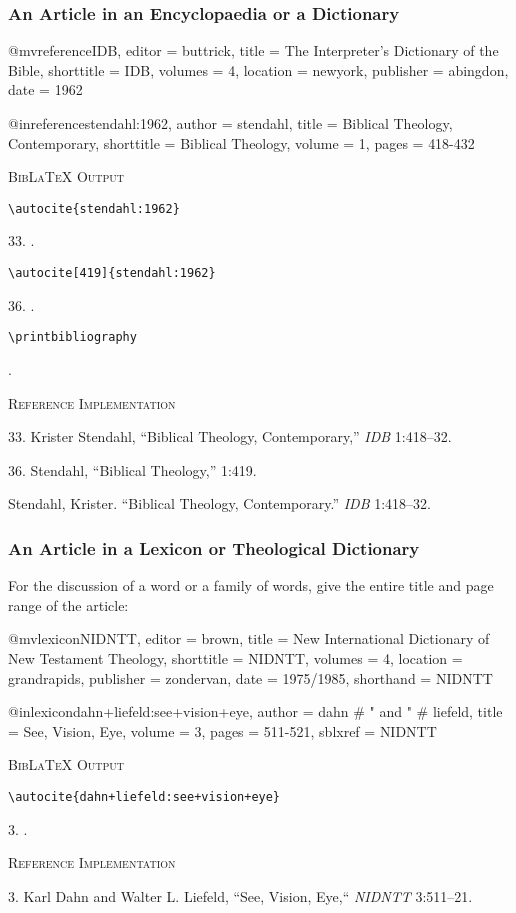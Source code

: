 \documentclass[a4paper]{article}
\newcommand\citetestnpf[4]{%
  {\textsc{BibLaTeX Output}\par
   \nobreak
   \texttt{\textbackslash autocite\{#4\}}\par
   \color{biblatex-colour}
   #1. \cite{#4}.\par
   \color{black}
   \texttt{\textbackslash autocite[#3]\{#4\}}\par
   \color{biblatex-colour}
   #2. \cite[#3]{#4}.\par
   \color{black}
   \texttt{\textbackslash printbibliography}\par
   \color{biblatex-colour}
   \hangindent\bibindent\bibentrycite{#4}.\par}}
\newcommand\citetestlex[2]{%
  {\textsc{BibLaTeX Output}\par
   \nobreak
   \texttt{\textbackslash autocite\{#2\}}\par
   \color{biblatex-colour}
   #1. \cite{#2}.\par}}
\newenvironment{refimp}{%
  \begin{minipage}{\linewidth}
    \setlength{\parskip}{1ex}
    \textsc{Reference Implementation}\par
    \nobreak
    \color{reference-colour}
}{\end{minipage}}
\newenvironment{vb}{%
  \setlength{\parskip}{0pt}
  \verbatim}{\endverbatim}
\begin{document}
\subsubsection{An Article in an Encyclopaedia or a Dictionary}

\begin{vb}
@mvreference{IDB,
  editor = buttrick,
  title = {The Interpreter's Dictionary of the Bible},
  shorttitle = {IDB},
  volumes = {4},
  location = newyork,
  publisher = abingdon,
  date = {1962}
}

@inreference{stendahl:1962,
  author = stendahl,
  title = {Biblical Theology, Contemporary},
  shorttitle = {Biblical Theology},
  volume = {1},
  pages = {418-432}
}
\end{vb}  

\citetestnpf{33}{36}{419}{stendahl:1962}

\begin{refimp}
  33. Krister Stendahl, “Biblical Theology, Contemporary,” \emph{IDB}
  1:418–32.
  
  36. Stendahl, “Biblical Theology,” 1:419.
  
  Stendahl, Krister. “Biblical Theology, Contemporary.” \emph{IDB} 1:418–32.
\end{refimp}

\subsubsection{An Article in a Lexicon or Theological Dictionary}

For the discussion of a word or a family of words, give the entire title and
page range of the article:

\begin{vb}
@mvlexicon{NIDNTT,
  editor = brown,
  title = {New International Dictionary of New Testament Theology},
  shorttitle = {NIDNTT},
  volumes = {4},
  location = grandrapids,
  publisher = zondervan,
  date = {1975/1985},
  shorthand = {NIDNTT}
}

@inlexicon{dahn+liefeld:see+vision+eye,
  author = dahn # " and " # liefeld,
  title = {See, Vision, Eye},
  volume = {3},
  pages = {511-521},
  sblxref = {NIDNTT}
}
\end{vb}

\citetestlex{3}{dahn+liefeld:see+vision+eye}

\begin{refimp}
  3. Karl Dahn and Walter L. Liefeld, “See, Vision, Eye,“ \emph{NIDNTT} 3:511–21.
\end{refimp}
\end{document}
